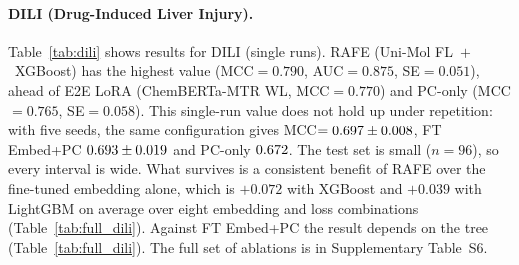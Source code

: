 \documentclass[pdflatex,sn-mathphys-num]{sn-jnl}%
\begin{document}
\begin{table}[!ht]
\centering
\caption{Best configurations on hERG (binary, cardiac ion-channel inhibition).}
\label{tab:herg}
\end{table}

\paragraph{DILI (Drug-Induced Liver Injury).} Table~\ref{tab:dili} shows results for DILI (single runs). RAFE (Uni-Mol FL~$+$~XGBoost) has the highest value (MCC$=0.790$, AUC$=0.875$, SE$=0.051$), ahead of E2E LoRA (ChemBERTa-MTR WL, MCC$=0.770$) and PC-only (MCC$=0.765$, SE$=0.058$). This single-run value does not hold up under repetition: with five seeds, the same configuration gives MCC$=0.697 \pm 0.008$, FT Embed+PC $0.693 \pm 0.019$ and PC-only $0.672$. The test set is small ($n=96$), so every interval is wide. What survives is a consistent benefit of RAFE over the fine-tuned embedding alone, which is $+0.072$ with XGBoost and $+0.039$ with LightGBM on average over eight embedding and loss combinations (Table~\ref{tab:full_dili}). Against FT Embed+PC the result depends on the tree (Table~\ref{tab:full_dili}). The full set of ablations is in Supplementary Table~S6.
\end{document}
